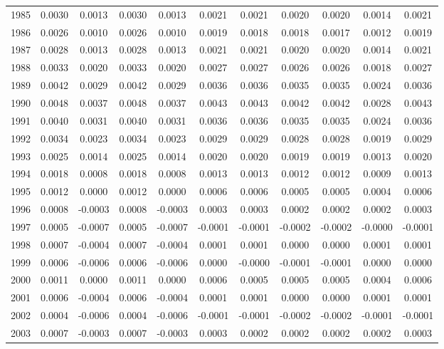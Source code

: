 \begin{tabular}{ccccccccccc}
  1985 & 0.0030 & 0.0013 & 0.0030 & 0.0013 & 0.0021 & 0.0021 & 0.0020 & 0.0020 & 0.0014 & 0.0021 \\ 
  1986 & 0.0026 & 0.0010 & 0.0026 & 0.0010 & 0.0019 & 0.0018 & 0.0018 & 0.0017 & 0.0012 & 0.0019 \\ 
  1987 & 0.0028 & 0.0013 & 0.0028 & 0.0013 & 0.0021 & 0.0021 & 0.0020 & 0.0020 & 0.0014 & 0.0021 \\ 
  1988 & 0.0033 & 0.0020 & 0.0033 & 0.0020 & 0.0027 & 0.0027 & 0.0026 & 0.0026 & 0.0018 & 0.0027 \\ 
  1989 & 0.0042 & 0.0029 & 0.0042 & 0.0029 & 0.0036 & 0.0036 & 0.0035 & 0.0035 & 0.0024 & 0.0036 \\ 
  1990 & 0.0048 & 0.0037 & 0.0048 & 0.0037 & 0.0043 & 0.0043 & 0.0042 & 0.0042 & 0.0028 & 0.0043 \\ 
  1991 & 0.0040 & 0.0031 & 0.0040 & 0.0031 & 0.0036 & 0.0036 & 0.0035 & 0.0035 & 0.0024 & 0.0036 \\ 
  1992 & 0.0034 & 0.0023 & 0.0034 & 0.0023 & 0.0029 & 0.0029 & 0.0028 & 0.0028 & 0.0019 & 0.0029 \\ 
  1993 & 0.0025 & 0.0014 & 0.0025 & 0.0014 & 0.0020 & 0.0020 & 0.0019 & 0.0019 & 0.0013 & 0.0020 \\ 
  1994 & 0.0018 & 0.0008 & 0.0018 & 0.0008 & 0.0013 & 0.0013 & 0.0012 & 0.0012 & 0.0009 & 0.0013 \\ 
  1995 & 0.0012 & 0.0000 & 0.0012 & 0.0000 & 0.0006 & 0.0006 & 0.0005 & 0.0005 & 0.0004 & 0.0006 \\ 
  1996 & 0.0008 & -0.0003 & 0.0008 & -0.0003 & 0.0003 & 0.0003 & 0.0002 & 0.0002 & 0.0002 & 0.0003 \\ 
  1997 & 0.0005 & -0.0007 & 0.0005 & -0.0007 & -0.0001 & -0.0001 & -0.0002 & -0.0002 & -0.0000 & -0.0001 \\ 
  1998 & 0.0007 & -0.0004 & 0.0007 & -0.0004 & 0.0001 & 0.0001 & 0.0000 & 0.0000 & 0.0001 & 0.0001 \\ 
  1999 & 0.0006 & -0.0006 & 0.0006 & -0.0006 & 0.0000 & -0.0000 & -0.0001 & -0.0001 & 0.0000 & 0.0000 \\ 
  2000 & 0.0011 & 0.0000 & 0.0011 & 0.0000 & 0.0006 & 0.0005 & 0.0005 & 0.0005 & 0.0004 & 0.0006 \\ 
  2001 & 0.0006 & -0.0004 & 0.0006 & -0.0004 & 0.0001 & 0.0001 & 0.0000 & 0.0000 & 0.0001 & 0.0001 \\ 
  2002 & 0.0004 & -0.0006 & 0.0004 & -0.0006 & -0.0001 & -0.0001 & -0.0002 & -0.0002 & -0.0001 & -0.0001 \\ 
  2003 & 0.0007 & -0.0003 & 0.0007 & -0.0003 & 0.0003 & 0.0002 & 0.0002 & 0.0002 & 0.0002 & 0.0003 \\ 

\end{tabular}
